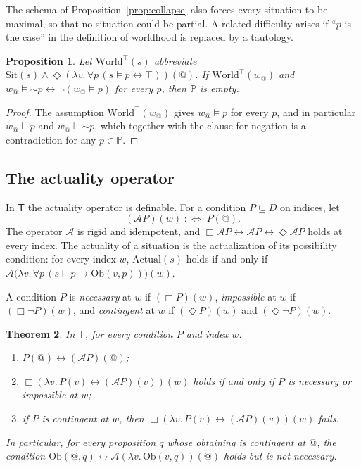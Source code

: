 \documentclass[11pt]{amsart}
\makeatletter
\theoremstyle{plain}
\newtheorem{theorem}{Theorem}[section]
\newtheorem{proposition}[theorem]{Proposition}
\theoremstyle{definition}
\theoremstyle{remark}
\newcommand{\Act}{\mathcal{A}}
\newcommand{\at}{@}
\newcommand{\aw}{w_{\at}}
\newcommand{\Sit}{\mathrm{Sit}}
\newcommand{\Obt}{\mathrm{Ob}}
\newcommand{\World}{\mathrm{World}}
\newcommand{\Actual}{\mathrm{Actual}}
\newcommand{\Prop}{\mathbb{P}}
\newcommand{\Dom}{D}
\newcommand{\T}{\mathsf{T}}
\newcommand{\pneg}{\mathord{\sim}}
\makeatother
\begin{document}
The schema of Proposition~\ref{prop:collapse} also forces every
situation to be maximal, so that no situation could be partial. A
related difficulty arises if ``$p$ is the case'' in the definition of
worldhood is replaced by a tautology.

\begin{proposition}
\label{prop:empty}
Let $\World^\top(s)$ abbreviate $\Sit(s) \wedge
\Diamond(\lambda v.\,\forall p\,(s \models p \leftrightarrow
\top))(\at)$. If $\World^\top(\aw)$ and
$\aw \models \pneg p \leftrightarrow \neg(\aw \models p)$ for every
$p$, then $\Prop$ is empty.
\end{proposition}

\begin{proof}
The assumption $\World^\top(\aw)$ gives $\aw \models p$ for every $p$,
and in particular $\aw \models p$ and $\aw \models \pneg p$, which
together with the clause for negation is a contradiction for any
$p \in \Prop$.
\end{proof}

\subsection{The actuality operator}

In $\T$ the actuality operator is definable. For a condition
$P \subseteq \Dom$ on indices, let
\[
  (\Act P)(w) \;:\Longleftrightarrow\; P(\at).
\]
The operator $\Act$ is rigid and idempotent, and
$\Box\Act P \leftrightarrow \Act P \leftrightarrow \Diamond\Act P$
holds at every index. The actuality of a situation is the
actualization of its possibility condition: for every index $w$,
$\Actual(s)$ holds if and only if
$\Act\bigl(\lambda v.\,\forall p\,(s \models p \to \Obt(v,p))\bigr)(w)$.

A condition $P$ is \emph{necessary} at $w$ if $(\Box P)(w)$,
\emph{impossible} at $w$ if $(\Box\neg P)(w)$, and \emph{contingent} at
$w$ if $(\Diamond P)(w)$ and $(\Diamond\neg P)(w)$.

\begin{theorem}
\label{thm:theory-actuality}
In $\T$, for every condition $P$ and index $w$:
\begin{enumerate}[label=(\roman*)]
\item $P(\at) \leftrightarrow (\Act P)(\at)$;
\item $\Box(\lambda v.\, P(v) \leftrightarrow (\Act P)(v))(w)$ holds if
  and only if $P$ is necessary or impossible at $w$;
\item if $P$ is contingent at $w$, then
  $\Box(\lambda v.\, P(v) \leftrightarrow (\Act P)(v))(w)$ fails.
\end{enumerate}
In particular, for every proposition $q$ whose obtaining is contingent
at $\at$, the condition $\Obt(\at,q) \leftrightarrow
\Act(\lambda v.\,\Obt(v,q))(\at)$ holds but is not necessary.
\end{theorem}
\end{document}
